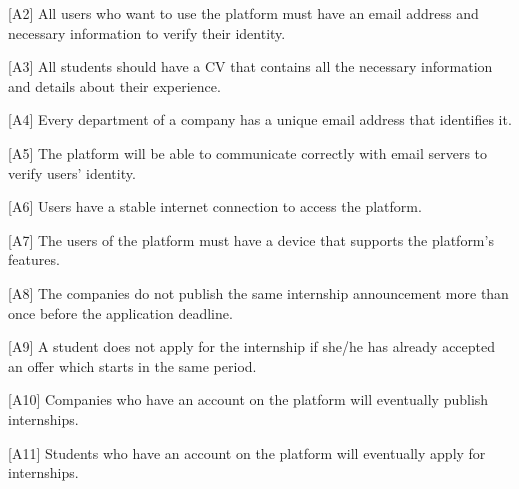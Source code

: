 [A2] All users who want to use the platform must have an email address and necessary information to verify their identity.

[A3] All students should have a CV that contains all the necessary information and details about their experience.

[A4] Every department of a company has a unique email address that identifies it.

[A5] The platform will be able to communicate correctly with email servers to verify users' identity.

[A6] Users have a stable internet connection to access the platform.

[A7] The users of the platform must have a device that supports the platform's features.

[A8] The companies do not publish the same internship announcement more than once before the application deadline.

[A9] A student does not apply for the internship if she/he has already accepted an offer which starts in the same period.

[A10] Companies who have an account on the platform will eventually publish internships.

[A11] Students who have an account on the platform will eventually apply for internships.